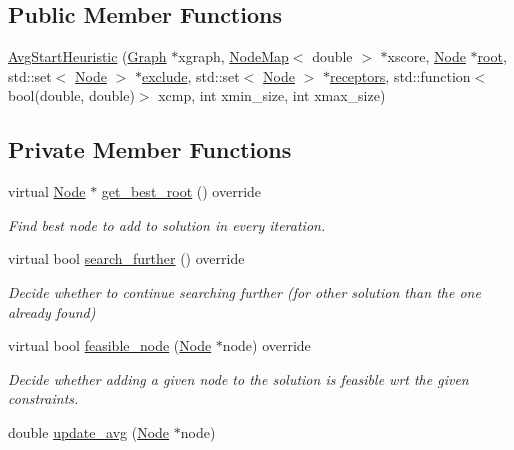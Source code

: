 \subsection*{Public Member Functions}
\begin{DoxyCompactItemize}
\item 
\hyperlink{classderegnet_1_1AvgStartHeuristic_afcbb54f71a6277598a40d6c06ebddbf0}{Avg\+Start\+Heuristic} (\hyperlink{namespacederegnet_a55b76c55bbabc682cbc61f8b9948799e}{Graph} $\ast$xgraph, \hyperlink{namespacederegnet_ae102b707ae1d6f83c639ece5e0dd5658}{Node\+Map}$<$ double $>$ $\ast$xscore, \hyperlink{namespacederegnet_a744bad34f2de9856d36715a445f027f3}{Node} $\ast$\hyperlink{classderegnet_1_1DeregnetStartHeuristic_a4605d41352e3adf1f9f9f32466a4e61e}{root}, std\+::set$<$ \hyperlink{namespacederegnet_a744bad34f2de9856d36715a445f027f3}{Node} $>$ $\ast$\hyperlink{classderegnet_1_1DeregnetStartHeuristic_aa22c6581cd404bf7ac325850b28dc951}{exclude}, std\+::set$<$ \hyperlink{namespacederegnet_a744bad34f2de9856d36715a445f027f3}{Node} $>$ $\ast$\hyperlink{classderegnet_1_1DeregnetStartHeuristic_ab80c046ff2b7c64086fceb84987b3e50}{receptors}, std\+::function$<$ bool(double, double)$>$ xcmp, int xmin\+\_\+size, int xmax\+\_\+size)
\end{DoxyCompactItemize}
\subsection*{Private Member Functions}
\begin{DoxyCompactItemize}
\item 
virtual \hyperlink{namespacederegnet_a744bad34f2de9856d36715a445f027f3}{Node} $\ast$ \hyperlink{classderegnet_1_1AvgStartHeuristic_ac13190b98b5611ad231fe3d9447431fb}{get\+\_\+best\+\_\+root} () override
\begin{DoxyCompactList}\small\item\em Find best node to add to solution in every iteration. \end{DoxyCompactList}\item 
virtual bool \hyperlink{classderegnet_1_1AvgStartHeuristic_a6fcfd578c66c01240d3484513a34bef6}{search\+\_\+further} () override
\begin{DoxyCompactList}\small\item\em Decide whether to continue searching further (for other solution than the one already found) \end{DoxyCompactList}\item 
virtual bool \hyperlink{classderegnet_1_1AvgStartHeuristic_a3e18528bc735d47edcd719a72baf4e46}{feasible\+\_\+node} (\hyperlink{namespacederegnet_a744bad34f2de9856d36715a445f027f3}{Node} $\ast$node) override
\begin{DoxyCompactList}\small\item\em Decide whether adding a given node to the solution is feasible wrt the given constraints. \end{DoxyCompactList}\item 
double \hyperlink{classderegnet_1_1AvgStartHeuristic_ab3cbc873952af7525654194a7d5e59e0}{update\+\_\+avg} (\hyperlink{namespacederegnet_a744bad34f2de9856d36715a445f027f3}{Node} $\ast$node)
\end{DoxyCompactItemize}

